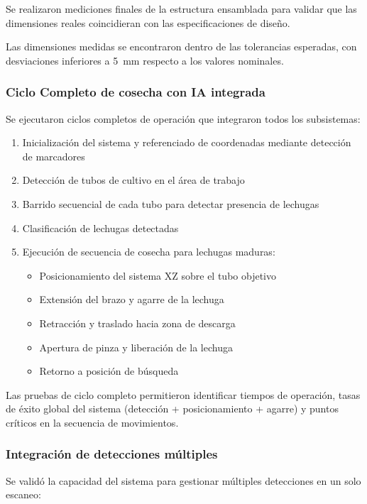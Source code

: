 Se realizaron mediciones finales de la estructura ensamblada para validar que las dimensiones reales coincidieran con las especificaciones de diseño.

Las dimensiones medidas se encontraron dentro de las tolerancias esperadas, con desviaciones inferiores a 5~mm respecto a los valores nominales.

\subsubsection{Ciclo Completo de cosecha con IA integrada}

Se ejecutaron ciclos completos de operación que integraron todos los subsistemas:

\begin{enumerate}
    \item Inicialización del sistema y referenciado de coordenadas mediante detección de marcadores
    \item Detección de tubos de cultivo en el área de trabajo
    \item Barrido secuencial de cada tubo para detectar presencia de lechugas
    \item Clasificación de lechugas detectadas
    \item Ejecución de secuencia de cosecha para lechugas maduras:
    \begin{itemize}
        \item Posicionamiento del sistema XZ sobre el tubo objetivo
        \item Extensión del brazo y agarre de la lechuga
        \item Retracción y traslado hacia zona de descarga
        \item Apertura de pinza y liberación de la lechuga
        \item Retorno a posición de búsqueda
    \end{itemize}
\end{enumerate}

Las pruebas de ciclo completo permitieron identificar tiempos de operación, tasas de éxito global del sistema (detección + posicionamiento + agarre) y puntos críticos en la secuencia de movimientos. 

\subsubsection{Integración de detecciones múltiples}

Se validó la capacidad del sistema para gestionar múltiples detecciones en un solo escaneo:

